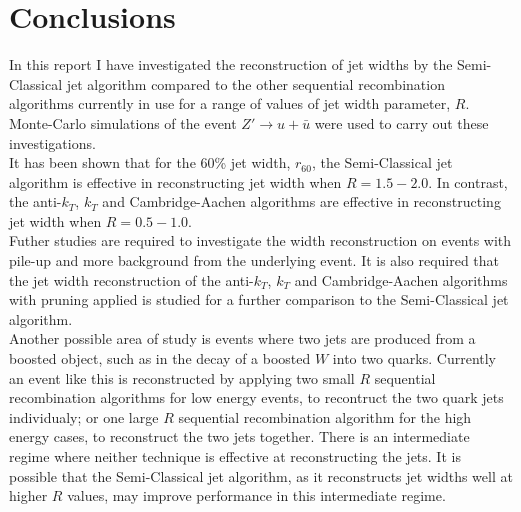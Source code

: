 \documentclass[a4paper,11pt, onecolumn]{article}
\begin{document}
  \newpage 
  \section{Conclusions}

  
  In this report I have investigated the reconstruction of jet widths by the Semi-Classical jet algorithm compared to the other sequential recombination algorithms 
  currently in use for a range of values of jet width parameter, $R$. Monte-Carlo simulations of the event $Z' \to u + \bar{u}$ were used to carry out these investigations. \\
  
  It has been shown that for the 60\% jet width, $r_{60}$, the Semi-Classical jet algorithm is effective in reconstructing jet width when $R = 1.5-2.0$. In contrast,
  the anti-$k_T$, $k_T$ and Cambridge-Aachen algorithms are effective in reconstructing jet width when $R=0.5-1.0$. \\

  Futher studies are required to investigate the width reconstruction on events with pile-up and more background from the underlying event. 
  It is also required that the jet width reconstruction of the anti-$k_T$, $k_T$ and Cambridge-Aachen algorithms with pruning applied is 
  studied for a further comparison to the Semi-Classical jet algorithm. \\

  Another possible area of study is events where two jets are produced from a boosted object, such as in the decay of a boosted $W$ into two quarks. 
  Currently an event like this is reconstructed by applying two small $R$ sequential recombination algorithms for low energy events, to recontruct the two quark jets individualy; 
  or one large $R$ sequential recombination algorithm for the high energy cases, to reconstruct the two jets together. There is an intermediate regime where neither technique
  is effective at reconstructing the jets. It is possible that the Semi-Classical jet algorithm, as it reconstructs jet widths well at higher $R$ values, may improve performance
  in this intermediate regime.
  
 
  

\newpage  



  
\end{document}
